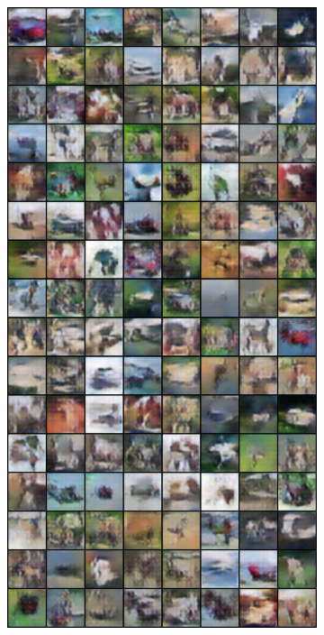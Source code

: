 \begin{figure}[H]
\begin{subfigure}{0.2\textwidth}
    \end{subfigure}%
    \begin{subfigure}{0.2\textwidth}
        \centering
        \includegraphics[width=0.95\linewidth]{cifar10/64_nz100/fake_sample_epoch_0010.png}
        \caption{}
        \label{subfig:cifar10/64_nz100/fake_sample_epoch_0010}
    \end{subfigure}%

\end{figure}
